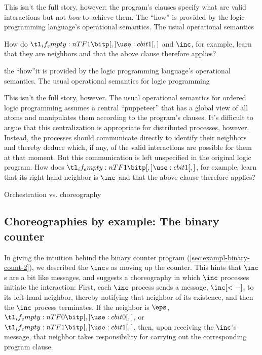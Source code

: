 This isn't the full story, however:
the program's clauses specify what are valid interactions but not \emph{how} to achieve them.
The \enquote{how} is provided by the logic programming language's operational semantics.
The usual operational semantics


How do $\bit{1}$ and $\inc$, for example, learn that they are neighbors and that the above clause therefore applies?


the \enquote{how}it is provided by the logic programming language's operational semantics.
The usual operational semantics for logic programming 

This isn't the full story, however.
The usual operational semantics for ordered logic programming assumes a central \enquote{puppeteer} that has a global view of all atoms and manipulates them according to the program's clauses.
It's difficult to argue that this centralization is appropriate for distributed processes, however.
Instead, the processes should communicate directly to identify their neighbors and thereby deduce which, if any, of the valid interactions are possible for them at that moment.
But this communication is left unspecified in the original logic program.
How does $\bit{1}$, for example, learn that its right-hand neighbor is $\inc$ and that the above clause therefore applies?


Orchestration vs. choreography


\subsection{Choreographies by example: The binary counter}\label{sec:exampl-chor-binary}

In giving the intuition behind the binary counter program (\cref{sec:exampl-binary-count-2}), we described the $\inc$s %
as moving up the counter.
This hints that $\inc$s are a bit like messages, and suggests a choreography in which $\inc$ processes initiate the interaction:
First, each $\inc$ process sends a message, $\inc[<-]$, to its left-hand neighbor, thereby notifying that neighbor of its existence, and then the $\inc$ process terminates.
If the neighbor is $\eps$, $\bit{0}$, or $\bit{1}$, then, upon receiving the $\inc$'s message, that neighbor takes responsibility for carrying out the corresponding program clause.  

